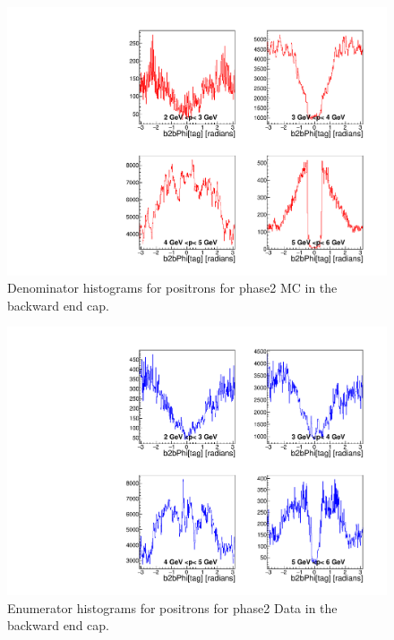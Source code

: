 \documentclass[a4paper,11pt,twosided,final,german,openbib,pdftex,listof=totoc,bibliography=totoc]{scrbook}
\begin{document}
\begin{appendix}
\begin{figure}[!htbp]
	\centering
	\includegraphics[width=\textwidth]{Plots/master/xPMPhiepECD_MC}
	\caption[Momentum $\phi$ Positron Backward End Cap Denominator Histogram Phase2 MC]{Denominator histograms for positrons for phase2 MC in the backward end cap.}
	\label{plt:PMPhiepECD_MC}
\end{figure}


\begin{figure}[!htbp]
	\centering
	\includegraphics[width=\textwidth]{Plots/master/xPMPhiepECE_Data}
	\caption[Momentum $\phi$ Positron Backward End Cap Enumerator Histogram Phase2 Data]{Enumerator histograms for positrons for phase2 Data in the backward end cap.}
	\label{plt:PMPhiepECE_Data}
\end{figure}


\end{appendix}
\end{document}
